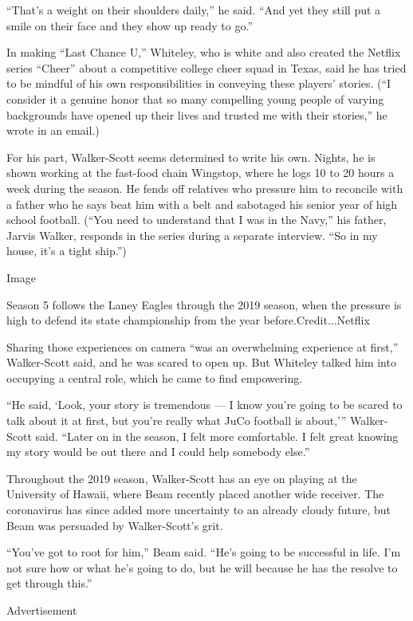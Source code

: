 ``That's a weight on their shoulders daily,'' he said. ``And yet they
still put a smile on their face and they show up ready to go.''

In making ``Last Chance U,'' Whiteley, who is white and also created the
Netflix series ``Cheer'' about a competitive college cheer squad in
Texas, said he has tried to be mindful of his own responsibilities in
conveying these players' stories. (``I consider it a genuine honor that
so many compelling young people of varying backgrounds have opened up
their lives and trusted me with their stories,'' he wrote in an email.)

For his part, Walker-Scott seems determined to write his own. Nights, he
is shown working at the fast-food chain Wingstop, where he logs 10 to 20
hours a week during the season. He fends off relatives who pressure him
to reconcile with a father who he says beat him with a belt and
sabotaged his senior year of high school football. (``You need to
understand that I was in the Navy,'' his father, Jarvis Walker, responds
in the series during a separate interview. ``So in my house, it's a
tight ship.'')

Image

Season 5 follows the Laney Eagles through the 2019 season, when the
pressure is high to defend its state championship from the year
before.Credit...Netflix

Sharing those experiences on camera ``was an overwhelming experience at
first,'' Walker-Scott said, and he was scared to open up. But Whiteley
talked him into occupying a central role, which he came to find
empowering.

``He said, `Look, your story is tremendous --- I know you're going to be
scared to talk about it at first, but you're really what JuCo football
is about,''' Walker-Scott said. ``Later on in the season, I felt more
comfortable. I felt great knowing my story would be out there and I
could help somebody else.''

Throughout the 2019 season, Walker-Scott has an eye on playing at the
University of Hawaii, where Beam recently placed another wide receiver.
The coronavirus has since added more uncertainty to an already cloudy
future, but Beam was persuaded by Walker-Scott's grit.

``You've got to root for him,'' Beam said. ``He's going to be successful
in life. I'm not sure how or what he's going to do, but he will because
he has the resolve to get through this.''

Advertisement

